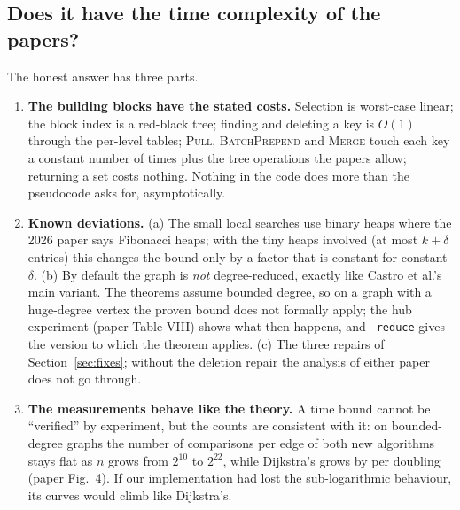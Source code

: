 \documentclass[11pt,a4paper]{article}
\newcommand{\code}[1]{\texttt{#1}}
\begin{document}
\subsection{Does it have the time complexity of the papers?}
The honest answer has three parts.
\begin{enumerate}
\item \textbf{The building blocks have the stated costs.} Selection is worst-case linear; the block index is a red-black tree; finding and deleting a key is $O(1)$ through the per-level tables; \textsc{Pull}, \textsc{BatchPrepend} and \textsc{Merge} touch each key a constant number of times plus the tree operations the papers allow; returning a set costs nothing. Nothing in the code does more than the pseudocode asks for, asymptotically.
\item \textbf{Known deviations.} (a) The small local searches use binary heaps where the 2026 paper says Fibonacci heaps; with the tiny heaps involved (at most $k+\delta$ entries) this changes the bound only by a factor that is constant for constant $\delta$. (b) By default the graph is \emph{not} degree-reduced, exactly like Castro et al.'s main variant. The theorems assume bounded degree, so on a graph with a huge-degree vertex the proven bound does not formally apply; the hub experiment (paper Table VIII) shows what then happens, and \code{--reduce} gives the version to which the theorem applies. (c) The three repairs of Section~\ref{sec:fixes}; without the deletion repair the analysis of either paper does not go through.
\item \textbf{The measurements behave like the theory.} A time bound cannot be ``verified'' by experiment, but the counts are consistent with it: on bounded-degree graphs the number of comparisons per edge of both new algorithms stays flat as $n$ grows from $2^{10}$ to $2^{22}$, while Dijkstra's grows by \SlopeRandDij{} per doubling (paper Fig.~4). If our implementation had lost the sub-logarithmic behaviour, its curves would climb like Dijkstra's.
\end{enumerate}
\end{document}
